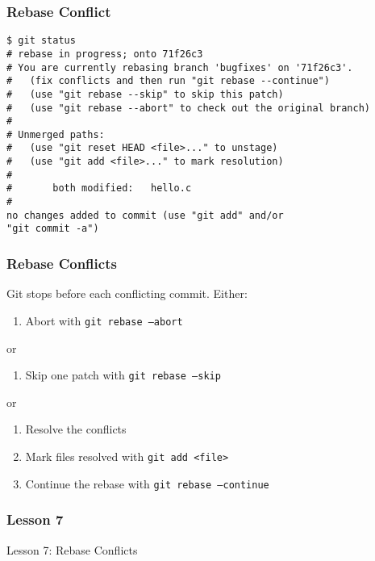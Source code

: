 \begin{frame}[fragile]
    \frametitle{Rebase Conflict}
    \footnotesize
    \begin{verbatim}
$ git status
# rebase in progress; onto 71f26c3
# You are currently rebasing branch 'bugfixes' on '71f26c3'.
#   (fix conflicts and then run "git rebase --continue")
#   (use "git rebase --skip" to skip this patch)
#   (use "git rebase --abort" to check out the original branch)
#
# Unmerged paths:
#   (use "git reset HEAD <file>..." to unstage)
#   (use "git add <file>..." to mark resolution)
#
#       both modified:   hello.c
#
no changes added to commit (use "git add" and/or
"git commit -a")
    \end{verbatim}
\end{frame}

\begin{frame}
    \frametitle{Rebase Conflicts}
    Git stops before each conflicting commit. Either:
    \medskip
    \begin{enumerate}[1.]
        \item Abort with \texttt{git rebase --abort}
    \end{enumerate}
    \medskip
    or
    \medskip
    \begin{enumerate}[1.]
        \item Skip one patch with \texttt{git rebase --skip}
    \end{enumerate}
    \medskip
    or
    \medskip
    \begin{enumerate}[1.]
        \item Resolve the conflicts
        \item Mark files resolved with \texttt{git add <file>}
        \item Continue the rebase with \texttt{git rebase --continue}
    \end{enumerate}
\end{frame}

\begin{frame}
    \frametitle{Lesson 7}
    \alert{Lesson 7}: Rebase Conflicts
\end{frame}

